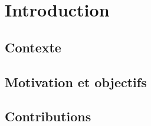 
\chapter{Introduction}

\label{ch:introduction}

\section{Contexte}


\section{Motivation et objectifs}


\section{Contributions}

